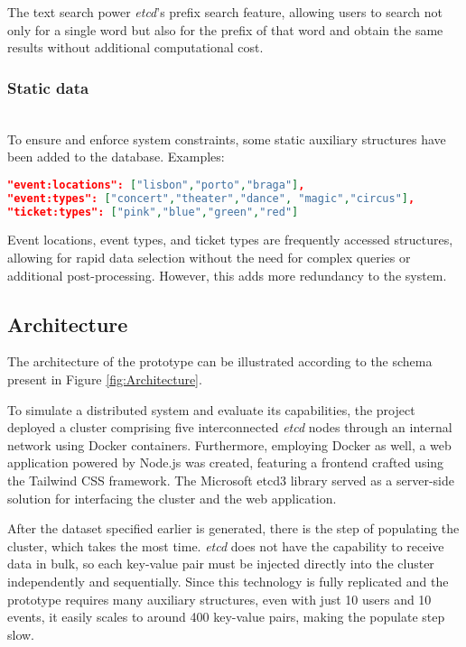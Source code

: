 \documentclass[screen,review]{acmart}
\begin{document}
The text search power \textit{etcd}'s prefix search feature, allowing users to search not only for a single word but also for the prefix of that word and obtain the same results without additional computational cost.\\

\subsubsection{Static data}~\\
To ensure and enforce system constraints, some static auxiliary structures have been added to the database. Examples:

\begin{lstlisting}[language=json]
"event:locations": ["lisbon","porto","braga"],
"event:types": ["concert","theater","dance", "magic","circus"],
"ticket:types": ["pink","blue","green","red"]
\end{lstlisting}

Event locations, event types, and ticket types are frequently accessed structures, allowing for rapid data selection without the need for complex queries or additional post-processing. However, this adds more redundancy to the system.

\subsection{Architecture}

The architecture of the prototype can be illustrated according to the schema present in Figure \ref{fig:Architecture}.

To simulate a distributed system and evaluate its capabilities, the project deployed a cluster comprising five interconnected \textit{etcd} nodes through an internal network using Docker \cite{docker} containers. Furthermore, employing Docker as well, a web application powered by Node.js \cite{node} was created, featuring a frontend crafted using the Tailwind CSS \cite{tailwind} framework. The Microsoft etcd3 library \cite{etcd_library} served as a server-side solution for interfacing the cluster and the web application.

After the dataset specified earlier is generated, there is the step of populating the cluster, which takes the most time. \textit{etcd} does not have the capability to receive data in bulk, so each key-value pair must be injected directly into the cluster independently and sequentially. Since this technology is fully replicated and the prototype requires many auxiliary structures, even with just 10 users and 10 events, it easily scales to around 400 key-value pairs, making the populate step slow.
\end{document}
